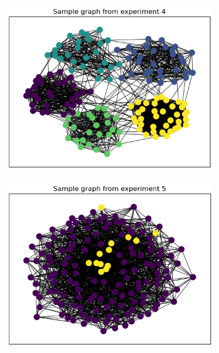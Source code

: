 \documentclass[switch, 12pt]{article}
\begin{document}
\begin{figure}[h]
    \hfill
    \begin{subfigure}{0.28\linewidth}
        \centering
        \includegraphics[width=\linewidth]{figures/exp4_sample.png}
    \end{subfigure}
    \hfill
    \begin{subfigure}{0.28\linewidth}
        \centering
        \includegraphics[width=\linewidth]{figures/exp5_sample.png}
    \end{subfigure}
    \hfill
    \begin{subfigure}{0.28\linewidth}
        \centering

\end{subfigure}
\end{figure}
\end{document}
